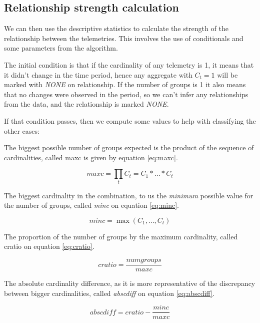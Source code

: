 \hypertarget{relationship-strength-calculation}{%
\subsection{Relationship strength calculation}\label{ch:querypart:heur:rel}}

We can then use the descriptive statistics to calculate the strength of the relationship between the telemetries.
This involves the use of conditionals and some parameters from the algorithm.

The initial condition is that if the cardinality of any telemetry is 1, it means that it didn't change in the time period, hence any aggregate with \(C_t=1\) will be marked with \emph{NONE} on relationship.
If the number of groups is 1 it also means that no changes were observed in the period, so we can't infer any relationships from the data, and the relationship is marked \emph{NONE}.

If that condition passes, then we compute some values to help with classifying the other cases:

The biggest possible number of groups expected is the product of the sequence of cardinalities, called maxc is given by equation \ref{eq:maxc}.

\begin{equation} \label{eq:maxc}
    maxc = \prod_{t}C_t = C_1 * ... * C_t
\end{equation}

The biggest cardinality in the combination, to us the \emph{minimum} possible value for the number of groups, called \emph{minc} on equation \ref{eq:minc}.

\begin{equation} \label{eq:minc}
    minc = \max(C_1,...,C_t)
\end{equation}

The proportion of the number of groups by the maximum cardinality, called cratio on equation \ref{eq:cratio}.

\begin{equation} \label{eq:cratio}
    cratio = \frac{numgroups}{maxc}
\end{equation}

The absolute cardinality difference, as it is more representative of the discrepancy between bigger cardinalities, called \emph{abscdiff} on equation \ref{eq:abscdiff}.

\begin{equation} \label{eq:abscdiff}
    abscdiff = cratio - \frac{minc}{maxc}
\end{equation}

